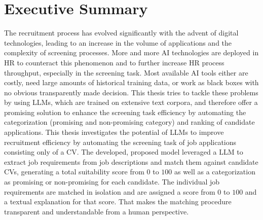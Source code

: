 \documentclass[draft,final]{thesisclass} %
\begin{document}

\tableofcontents %

\chapter{Executive Summary}
The recruitment process has evolved significantly with the advent of digital technologies, leading to an increase in the volume of applications and the complexity of screening processes. More and more \acs{AI} technologies are deployed in \acs{HR} to counteract this phenomenon and to further increase \acs{HR} process throughput, especially in the screening task. Most available \acs{AI} tools either are costly, need large amounts of historical training data, or work as black boxes with no obvious transparently made decision. This thesis tries to tackle these problems by using \gls{LLM}s, which are trained on extensive text corpora, and therefore offer a promising solution to enhance the screening task efficiency by automating the categorization (promising and non-promising category) and ranking of candidate applications. This thesis investigates the potential of \gls{LLM}s to improve recruitment efficiency by automating the screening task of job applications consisting only of a \acs{CV}. The developed, proposed model leveraged a \gls{LLM} to extract job requirements from job descriptions and match them against candidate \acs{CV}s, generating a total suitability score from $0$ to $100$ as well as a categorization as promising or non-promising for each candidate. The individual job requirements are matched in isolation and are assigned a score from $0$ to $100$ and a textual explanation for that score. That makes the matching procedure transparent and understandable from a human perspective.
\end{document}
